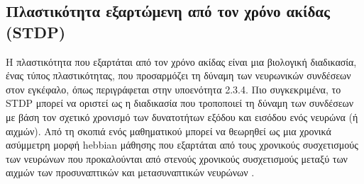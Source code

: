 \documentclass[12pt]{report}
\begin{document}
\subsection{Πλαστικότητα εξαρτώμενη από τον χρόνο ακίδας (\textlatin{STDP})}

Η πλαστικότητα που εξαρτάται από τον χρόνο ακίδας είναι μια βιολογική διαδικασία, ένας τύπος πλαστικότητας, που προσαρμόζει τη δύναμη των νευρωνικών συνδέσεων στον εγκέφαλο, όπως περιγράφεται στην υποενότητα 2.3.4. Πιο συγκεκριμένα, το \textlatin{STDP} μπορεί να οριστεί ως η διαδικασία που τροποποιεί τη δύναμη των συνδέσεων με βάση τον σχετικό χρονισμό των δυνατοτήτων εξόδου και εισόδου ενός νευρώνα (ή αιχμών). Από τη σκοπιά ενός μαθηματικού μπορεί να θεωρηθεί ως μια χρονικά ασύμμετρη μορφή \textlatin{hebbian} μάθησης που εξαρτάται από τους χρονικούς συσχετισμούς των νευρώνων που προκαλούνται από στενούς χρονικούς συσχετισμούς μεταξύ των αιχμών των προσυναπτικών και μετασυναπτικών νευρώνων \cite{stdp2010}.
\end{document}

